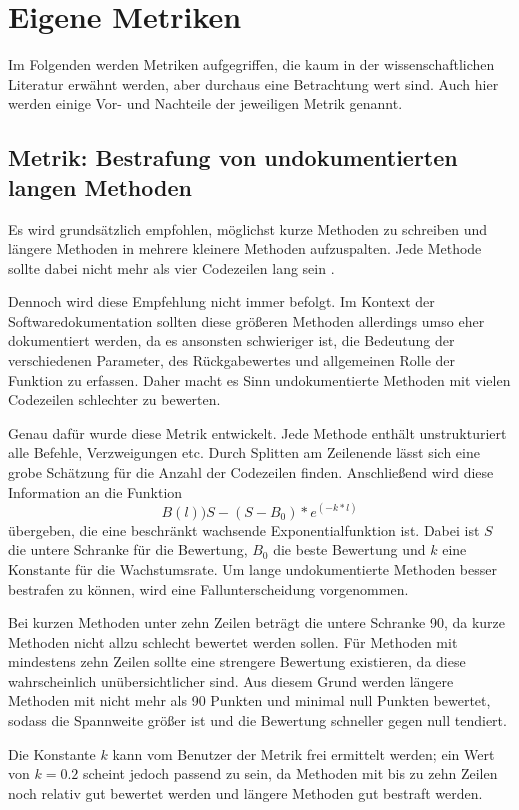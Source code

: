  \section{Eigene Metriken}
 Im Folgenden werden Metriken aufgegriffen, die kaum in der wissenschaftlichen Literatur erwähnt werden, aber durchaus eine Betrachtung wert sind. Auch hier werden einige Vor- und Nachteile der jeweiligen Metrik genannt.
 \subsection{Metrik: Bestrafung von undokumentierten langen Methoden}
Es wird grundsätzlich empfohlen, möglichst kurze Methoden zu schreiben und längere Methoden in mehrere kleinere Methoden aufzuspalten. Jede Methode sollte dabei nicht mehr als vier Codezeilen lang sein \cite[S. 34]{martin2009clean}.
 
 Dennoch wird diese Empfehlung nicht immer befolgt. Im Kontext der Softwaredokumentation sollten diese größeren Methoden allerdings umso eher dokumentiert werden, da es ansonsten schwieriger ist, die Bedeutung der verschiedenen Parameter, des Rückgabewertes und allgemeinen Rolle der Funktion zu erfassen. Daher macht es Sinn undokumentierte Methoden mit vielen Codezeilen schlechter zu bewerten.
 
 Genau dafür wurde diese Metrik entwickelt. Jede Methode enthält unstrukturiert alle Befehle, Verzweigungen etc. Durch Splitten am Zeilenende lässt sich eine grobe Schätzung für die Anzahl der Codezeilen finden. Anschließend wird diese Information  an die Funktion
 \begin{equation}
     B(l))S-(S-B_0)*e^(-k*l)
 \end{equation} übergeben, die eine beschränkt wachsende Exponentialfunktion ist. Dabei ist $S$ die untere Schranke für die Bewertung, $B_0$ die beste Bewertung und $k$ eine Konstante für die Wachstumsrate. Um lange undokumentierte Methoden besser bestrafen zu können, wird eine Fallunterscheidung vorgenommen.
 
 Bei kurzen Methoden unter zehn Zeilen beträgt die untere Schranke 90, da kurze Methoden nicht allzu schlecht bewertet werden sollen. Für Methoden mit mindestens zehn Zeilen sollte eine strengere Bewertung existieren, da diese wahrscheinlich unübersichtlicher sind. Aus diesem Grund werden längere Methoden mit nicht mehr als 90 Punkten und minimal null Punkten bewertet, sodass die Spannweite größer ist und die Bewertung schneller gegen null tendiert.
 
 Die Konstante $k$ kann vom Benutzer der Metrik frei ermittelt werden; ein Wert von $k=0.2$ scheint jedoch passend zu sein, da Methoden mit bis zu zehn Zeilen noch relativ gut bewertet werden und längere Methoden gut bestraft werden.
 
